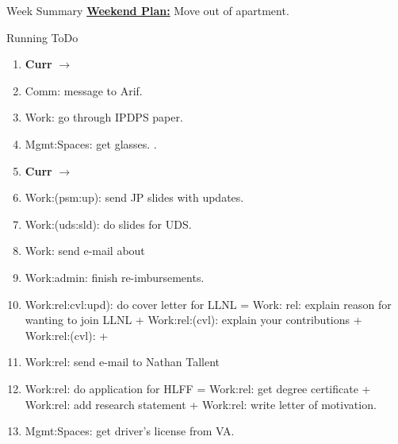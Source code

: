 \begin{columns}
\begin{column}{0.6\linewidth}
\begin{block}{Week Summary}
      {\underline{\bf Weekend Plan:} Move out of apartment. } \\

    \end{block}
    \begin{block}{Running ToDo} %
      
      \begin{enumerate}
      \item \tiny \textbf{Curr} $\rightarrow$ 
      \item \tiny Comm: message to Arif. 
      \item \tiny Work: go through IPDPS paper.  
      \item \tiny Mgmt:Spaces: get glasses. 
        .
     
      \item \tiny \textbf{Curr} $\rightarrow$ 
      \item \tiny Work:(psm:up): send JP slides with updates. 
      \item \tiny Work:(uds:sld): do slides for UDS. 
      \item \tiny Work: send e-mail about 
        
        \tiny \item \tiny Work:admin: finish re-imbursements. 
        
      \item \tiny Work:rel:cvl:upd):  do cover letter for LLNL = Work: rel: explain reason for wanting to join LLNL + Work:rel:(cvl): explain your
        contributions + Work:rel:(cvl):  +       \item \tiny Work:rel: send e-mail to Nathan Tallent 
       
      \item \tiny Work:rel: do application for HLFF = Work:rel: get degree
        certificate + Work:rel: add research statement + Work:rel: write letter of motivation.  

      \item \tiny Mgmt:Spaces: get driver's license from VA.        
 

\end{enumerate}
\end{block}
\end{column}
\end{columns}

